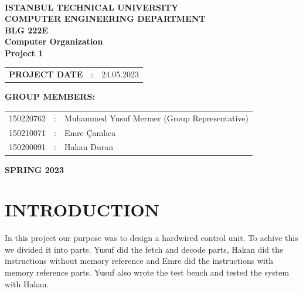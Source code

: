 \documentclass[pdftex,12pt,a4paper]{article}
\begin{document}
\begin{titlepage}
\begin{center}
\textbf{}\\
\textbf{\Large{ISTANBUL TECHNICAL UNIVERSITY}}\\
\vspace{0.5cm}
\textbf{\Large{COMPUTER ENGINEERING DEPARTMENT}}\\
\vspace{2cm}
\textbf{\Large{BLG 222E\\ Computer Organization \\ Project 1}}\\
\vspace{2.8cm}
\begin{table}[ht]
\centering
\Large{
\begin{tabular}{lcl}
\textbf{PROJECT DATE}  & : & 24.05.2023\\
\end{tabular}}
\end{table}
\vspace{1cm}
\textbf{\Large{GROUP MEMBERS:}}\\
\begin{table}[ht]
\centering
\Large{
\begin{tabular}{rcl}
150220762  & : & Muhammed Yusuf Mermer (Group Representative)  \\
150210071  & : & Emre Çamlıca \\
150200091  & : & Hakan Duran \\
\end{tabular}}
\end{table}
\vspace{2.8cm}
\textbf{\Large{SPRING 2023}}

\end{center}

\end{titlepage}

\thispagestyle{empty}
\setcounter{tocdepth}{4}
\tableofcontents
\clearpage

\setcounter{page}{1}
\section{INTRODUCTION}
In this project our purpose was to design a hardwired control unit. To achive this we divided it into parts. Yusuf did 
the fetch and decode parts, Hakan did the instructions without memory reference and Emre did the instructions with 
memory reference parts. Yusuf also wrote the test bench and tested the system with Hakan. 
\end{document}
